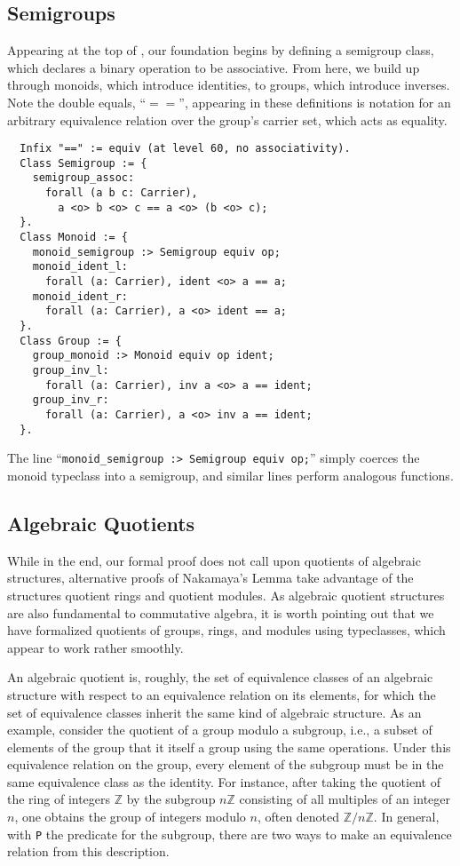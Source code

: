 \documentclass[referee,sn-mathphys]{sn-jnl}
\theoremstyle{definition}
\theoremstyle{remark}
\numberwithin{equation}{section}
\numberwithin{figure}{subsection}
\begin{document}
\subsection{Semigroups} 
Appearing at the top of , our
 foundation begins by defining a semigroup class, which declares a binary
operation to be associative. From here, we build up through monoids, which
introduce identities, to groups, which introduce inverses. Note the double
equals, ``$==$'', appearing in these definitions is notation for an arbitrary
equivalence relation over the group's carrier set, which acts as equality.

\begin{verbatim}
  Infix "==" := equiv (at level 60, no associativity).
  Class Semigroup := {
    semigroup_assoc:
      forall (a b c: Carrier),
        a <o> b <o> c == a <o> (b <o> c);
  }.
  Class Monoid := {
    monoid_semigroup :> Semigroup equiv op;
    monoid_ident_l:
      forall (a: Carrier), ident <o> a == a;
    monoid_ident_r:
      forall (a: Carrier), a <o> ident == a;
  }.
  Class Group := {
    group_monoid :> Monoid equiv op ident;
    group_inv_l:
      forall (a: Carrier), inv a <o> a == ident;
    group_inv_r:
      forall (a: Carrier), a <o> inv a == ident;
  }.
\end{verbatim}
The line  ``\verb|monoid_semigroup :> Semigroup equiv op;|'' simply coerces
the monoid typeclass into a semigroup, and similar lines perform analogous functions.


\subsection{Algebraic Quotients}
While in the end, our formal proof does not call upon quotients of
algebraic structures, alternative proofs of Nakamaya's Lemma take advantage of 
 the structures quotient rings and quotient modules.  As algebraic 
 quotient structures are also fundamental to commutative algebra,
it is worth pointing out that we have formalized quotients of groups, rings, and modules 
  using typeclasses, which appear to work rather smoothly. 

An algebraic quotient is, roughly, the set of equivalence classes of an
algebraic structure with respect to an equivalence relation on its elements,
for which the set of equivalence classes inherit the same kind of algebraic
structure. 
As an example, consider the quotient of a group modulo a subgroup,
i.e., a subset of elements of the group that it itself a group using the same operations. 
Under this equivalence relation on the group, every element of the
subgroup must be in the same equivalence class as the identity. 
For instance, after taking the quotient of the ring of integers $\mathbb{Z}$ by the
subgroup $n \mathbb{Z}$ consisting of all multiples of an integer $n$, one obtains the
group of integers modulo $n$, often denoted $\mathbb{Z}/n\mathbb{Z}$.
In general, with \texttt{P}
the predicate for the subgroup, there are two ways to make an equivalence
relation from this description.
\end{document}
